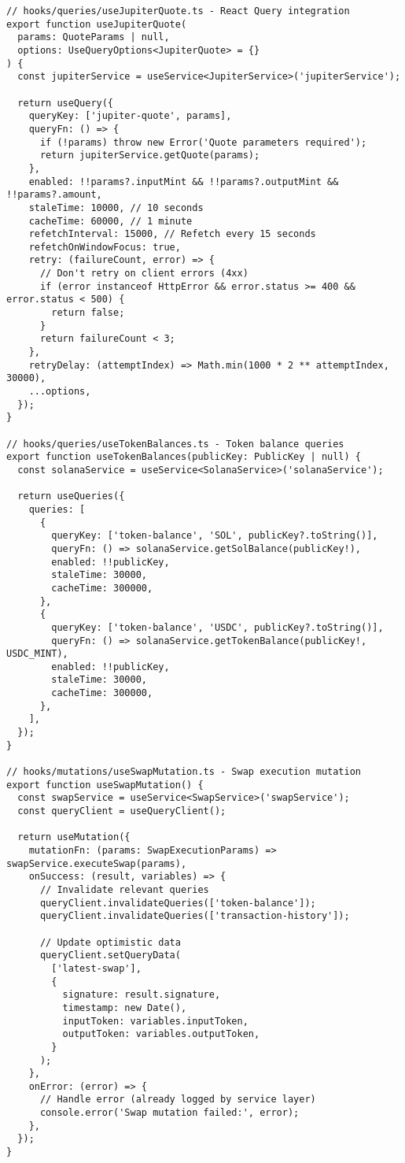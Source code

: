 \documentclass[11pt,a4paper]{article}
\begin{document}
\begin{lstlisting}[style=typescript, caption=React Query Integration with Caching]
// hooks/queries/useJupiterQuote.ts - React Query integration
export function useJupiterQuote(
  params: QuoteParams | null,
  options: UseQueryOptions<JupiterQuote> = {}
) {
  const jupiterService = useService<JupiterService>('jupiterService');
  
  return useQuery({
    queryKey: ['jupiter-quote', params],
    queryFn: () => {
      if (!params) throw new Error('Quote parameters required');
      return jupiterService.getQuote(params);
    },
    enabled: !!params?.inputMint && !!params?.outputMint && !!params?.amount,
    staleTime: 10000, // 10 seconds
    cacheTime: 60000, // 1 minute
    refetchInterval: 15000, // Refetch every 15 seconds
    refetchOnWindowFocus: true,
    retry: (failureCount, error) => {
      // Don't retry on client errors (4xx)
      if (error instanceof HttpError && error.status >= 400 && error.status < 500) {
        return false;
      }
      return failureCount < 3;
    },
    retryDelay: (attemptIndex) => Math.min(1000 * 2 ** attemptIndex, 30000),
    ...options,
  });
}

// hooks/queries/useTokenBalances.ts - Token balance queries
export function useTokenBalances(publicKey: PublicKey | null) {
  const solanaService = useService<SolanaService>('solanaService');
  
  return useQueries({
    queries: [
      {
        queryKey: ['token-balance', 'SOL', publicKey?.toString()],
        queryFn: () => solanaService.getSolBalance(publicKey!),
        enabled: !!publicKey,
        staleTime: 30000,
        cacheTime: 300000,
      },
      {
        queryKey: ['token-balance', 'USDC', publicKey?.toString()],
        queryFn: () => solanaService.getTokenBalance(publicKey!, USDC_MINT),
        enabled: !!publicKey,
        staleTime: 30000,
        cacheTime: 300000,
      },
    ],
  });
}

// hooks/mutations/useSwapMutation.ts - Swap execution mutation
export function useSwapMutation() {
  const swapService = useService<SwapService>('swapService');
  const queryClient = useQueryClient();
  
  return useMutation({
    mutationFn: (params: SwapExecutionParams) => swapService.executeSwap(params),
    onSuccess: (result, variables) => {
      // Invalidate relevant queries
      queryClient.invalidateQueries(['token-balance']);
      queryClient.invalidateQueries(['transaction-history']);
      
      // Update optimistic data
      queryClient.setQueryData(
        ['latest-swap'],
        {
          signature: result.signature,
          timestamp: new Date(),
          inputToken: variables.inputToken,
          outputToken: variables.outputToken,
        }
      );
    },
    onError: (error) => {
      // Handle error (already logged by service layer)
      console.error('Swap mutation failed:', error);
    },
  });
}
\end{lstlisting}
\end{document}

